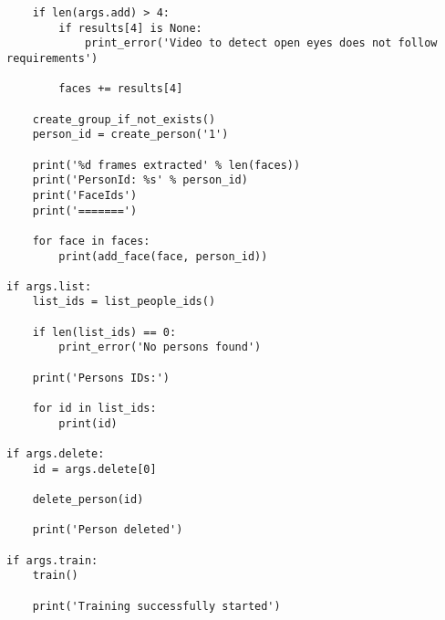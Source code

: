 \begin{verbatim}
    if len(args.add) > 4:
        if results[4] is None:
            print_error('Video to detect open eyes does not follow requirements')

        faces += results[4]

    create_group_if_not_exists()
    person_id = create_person('1')

    print('%d frames extracted' % len(faces))
    print('PersonId: %s' % person_id)
    print('FaceIds')
    print('=======')

    for face in faces:
        print(add_face(face, person_id))

if args.list:
    list_ids = list_people_ids()

    if len(list_ids) == 0:
        print_error('No persons found')

    print('Persons IDs:')

    for id in list_ids:
        print(id)

if args.delete:
    id = args.delete[0]

    delete_person(id)

    print('Person deleted')

if args.train:
    train()

    print('Training successfully started')
\end{verbatim}

